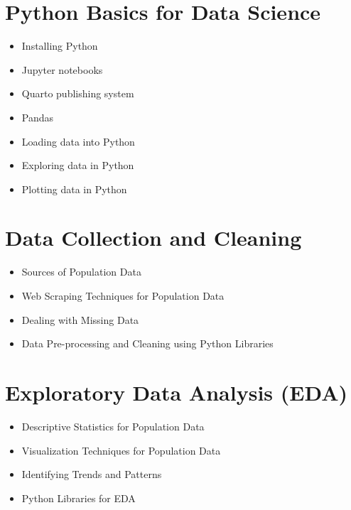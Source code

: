 \documentclass[
]{book}
\providecommand{\tightlist}{%
  \setlength{\itemsep}{0pt}\setlength{\parskip}{0pt}}\usepackage{longtable,booktabs,array}
\begin{document}
\hypertarget{python-basics-for-data-science}{%
\chapter{\texorpdfstring{\textbf{Python Basics for Data
Science}}{Python Basics for Data Science}}\label{python-basics-for-data-science}}

\begin{itemize}
\tightlist
\item
  Installing Python
\item
  Jupyter notebooks
\item
  Quarto publishing system
\item
  Pandas
\item
  Loading data into Python
\item
  Exploring data in Python
\item
  Plotting data in Python
\end{itemize}

\hypertarget{data-collection-and-cleaning}{%
\chapter{\texorpdfstring{\textbf{Data Collection and
Cleaning}}{Data Collection and Cleaning}}\label{data-collection-and-cleaning}}

\begin{itemize}
\tightlist
\item
  Sources of Population Data
\item
  Web Scraping Techniques for Population Data
\item
  Dealing with Missing Data
\item
  Data Pre-processing and Cleaning using Python Libraries
\end{itemize}

\hypertarget{exploratory-data-analysis-eda}{%
\chapter{\texorpdfstring{\textbf{Exploratory Data Analysis
(EDA)}}{Exploratory Data Analysis (EDA)}}\label{exploratory-data-analysis-eda}}

\begin{itemize}
\tightlist
\item
  Descriptive Statistics for Population Data
\item
  Visualization Techniques for Population Data
\item
  Identifying Trends and Patterns
\item
  Python Libraries for EDA
\end{itemize}
\end{document}
